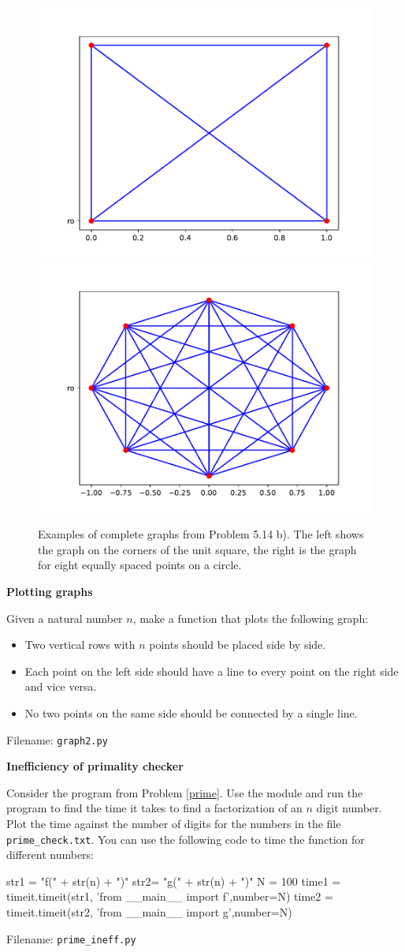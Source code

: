 \begin{figure}
    \centerline{
    \includegraphics[width=0.45\linewidth]{./figs/square.pdf}
    \includegraphics[width=0.45\linewidth]{./figs/circle.pdf}}
    \caption{Examples of complete graphs from Problem 5.14 b). The left shows the graph on the
    corners of the unit square, the right is the graph for eight equally spaced points on a circle.}
    \label{fig:graphs}
\end{figure}


\begin{Problem}{\textbf{Plotting graphs}}

\noindent Given a natural number $n$, make a function that plots the following graph:
\begin{itemize}
    \item Two vertical rows with $n$ points should be placed side by side.
    \item Each point on the left side should have a line to every point on the
    right side and vice versa.
    \item No two points on the same side should be connected by a single line.
\end{itemize}
Filename: \texttt{graph2.py}
\end{Problem}


\begin{Problem}{\textbf{Inefficiency of primality checker}}

\noindent Consider the program from Problem \ref{prime}. Use the  module and run the
program to find the time it takes to find a factorization of an $n$ digit number. Plot the time against
the number of digits for the numbers in the file \texttt{prime\_check.txt}.
You can use the following code to time the function for different numbers:
\begin{python}
str1 = "f(" + str(n) + ")"
str2= "g(" + str(n) + ")"
N = 100
time1 = timeit.timeit(str1, 'from __main__ import f',number=N)
time2 = timeit.timeit(str2, 'from __main__ import g',number=N)
\end{python}

Filename: \texttt{prime\_ineff.py}
\end{Problem}

